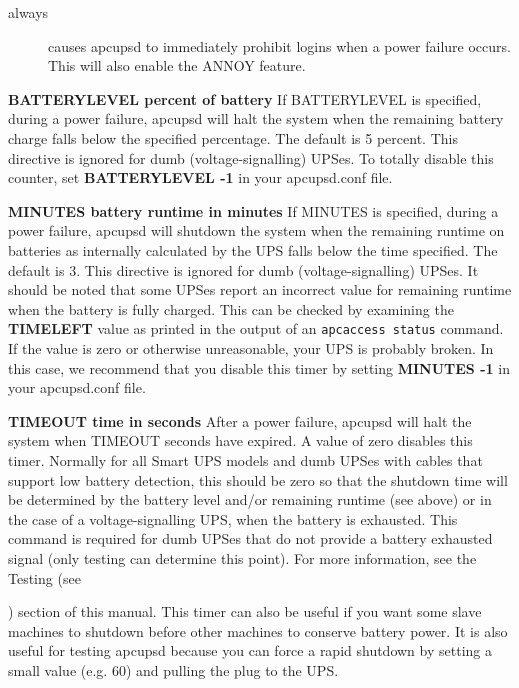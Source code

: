 {{{{{{{{{{{\begin{description}
\begin{description}
\item [always]
   causes apcupsd to immediately prohibit logins when a power failure occurs.
This will also enable the ANNOY feature. 
\end{description}


\item {\bf BATTERYLEVEL \lt{}percent of battery\gt{}}
   If BATTERYLEVEL is specified, during a power failure, apcupsd will halt the
system when the remaining battery charge falls below the specified percentage.
The default is 5 percent. This directive is ignored for dumb
(voltage-signalling) UPSes. To totally disable this counter, set {\bf
BATTERYLEVEL -1} in your apcupsd.conf file.  

\item {\bf MINUTES \lt{}battery runtime in minutes\gt{}}
   If MINUTES is specified, during a power failure, apcupsd will shutdown the
system when the remaining runtime on batteries as internally calculated by the
UPS falls below the time specified. The default is 3. This directive is
ignored for dumb (voltage-signalling) UPSes. It should be noted that some
UPSes report an incorrect value for remaining runtime when the battery is
fully charged. This can be checked by examining the {\bf TIMELEFT} value as
printed in the output of an {\tt apcaccess status} command. If the value is
zero or otherwise unreasonable, your UPS is probably broken. In this case, we
recommend that you disable this timer by setting {\bf MINUTES -1} in your
apcupsd.conf file.  

\item {\bf TIMEOUT \lt{}time in seconds\gt{}}
   After a power failure, apcupsd will halt the system when TIMEOUT seconds have
expired.  A value of zero disables this timer. Normally for all Smart UPS
models and dumb UPSes with cables that support low battery detection, this
should be zero so that the shutdown time will be determined by the battery
level and/or remaining runtime (see above) or in the case of a
voltage-signalling UPS, when the battery is exhausted.  This command is
required for dumb UPSes that do not provide a battery exhausted signal (only
testing can determine this point).  For more information, see the Testing (see

) section of this manual. 
This timer can also be useful if you want some slave machines to shutdown
before other machines to conserve battery power.  It is also useful for
testing apcupsd because you can force a rapid shutdown by setting a small
value (e.g.  60) and pulling the plug to the UPS.  


\end{description}}}}}}}}}}}}
